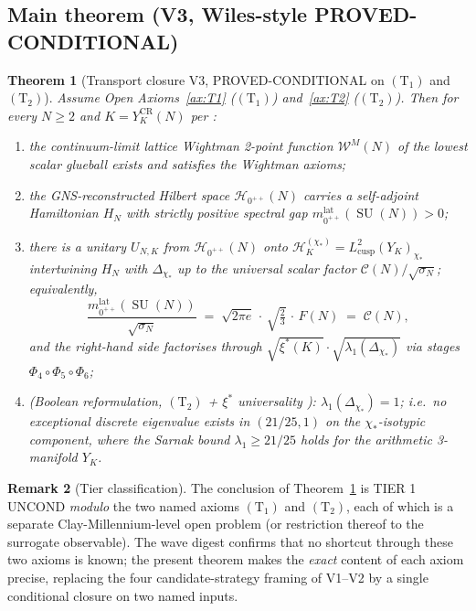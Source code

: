 \documentclass[11pt,a4paper,reqno]{amsart}
\newtheorem{theorem}{Theorem}[section]
\theoremstyle{definition}
\newtheorem{remark}[theorem]{Remark}
\DeclareMathOperator{\SU}{SU}
\newcommand{\YK}{Y_K}
\newcommand{\YKCR}{Y_K^{\mathrm{CR}}}
\newcommand{\Phii}[1]{\Phi_{#1}}
\newcommand{\xis}{\xi^{*}}
\newcommand{\Lcusp}{L^2_{\mathrm{cusp}}}
\newcommand{\Cone}{(\mathrm{T}_{1})}
\newcommand{\Ctwo}{(\mathrm{T}_{2})}
\begin{document}
\subsection{Main theorem (V3, Wiles-style PROVED-CONDITIONAL)}\label{ss:mainthm}

\begin{theorem}[Transport closure V3, PROVED-CONDITIONAL on $\Cone$
  and $\Ctwo$]\label{thm:transport-V3}
  Assume Open Axioms~\ref{ax:T1} ($\Cone$) and~\ref{ax:T2} ($\Ctwo$).
  Then for every $N\ge 2$ and $K = \YKCR(N)$ per
  \cite{Remondiere2026CenterRank} :
  \begin{enumerate}[label={\rm(\roman*)}, leftmargin=2em]
    \item the continuum-limit lattice Wightman 2-point function
          $\mathcal{W}^M(N)$ of the lowest scalar glueball exists and
          satisfies the Wightman axioms;
    \item the GNS-reconstructed Hilbert space $\mathcal{H}_{0^{++}}(N)$
          carries a self-adjoint Hamiltonian $H_N$ with strictly
          positive spectral gap $m_{0^{++}}^{\mathrm{lat}}(\SU(N))>0$;
    \item there is a unitary $U_{N,K}$ from $\mathcal{H}_{0^{++}}(N)$
          onto $\mathcal{H}^{(\chi_*)}_K = \Lcusp(\YK)_{\chi_*}$
          intertwining $H_N$ with $\Delta_{\chi_*}$ up to the
          universal scalar factor $\mathcal{C}(N)/\sqrt{\sigma_N}$;
          equivalently,
          \begin{equation}\label{eq:thm-main}
             \frac{m_{0^{++}}^{\mathrm{lat}}(\SU(N))}{\sqrt{\sigma_N}}
             \;=\;
             \sqrt{2\pi e}\,\cdot\,\sqrt{\tfrac{2}{3}}\,\cdot\,F(N)
             \;=\; \mathcal{C}(N),
          \end{equation}
          and the right-hand side factorises through
          $\sqrt{\xis(K)}\cdot\sqrt{\lambda_1(\Delta_{\chi_*})}$
          via stages $\Phii{4}\circ\Phii{5}\circ\Phii{6}$;
    \item (Boolean reformulation, $\Ctwo$ + $\xis$ universality
          \cite{Remondiere2026CR}): $\lambda_1(\Delta_{\chi_*})=1$;
          i.e.\ no exceptional discrete eigenvalue exists in
          $(21/25, 1)$ on the $\chi_*$-isotypic component, where the
          Sarnak bound $\lambda_1\ge 21/25$ \cite{Sarnak1983} holds
          for the arithmetic 3-manifold $\YK$.
  \end{enumerate}
\end{theorem}

\begin{remark}[Tier classification]
The conclusion of Theorem~\ref{thm:transport-V3} is TIER 1 UNCOND
\emph{modulo} the two named axioms $\Cone$ and $\Ctwo$, each of which
is a separate Clay-Millennium-level open problem (or restriction
thereof to the surrogate observable). The wave digest
\cite{Remondiere2026TransportWaveDigest} confirms that no shortcut
through these two axioms is known; the present theorem makes the
\emph{exact} content of each axiom precise, replacing the four
candidate-strategy framing of V1--V2 by a single conditional
closure on two named inputs.
\end{remark}
\end{document}
